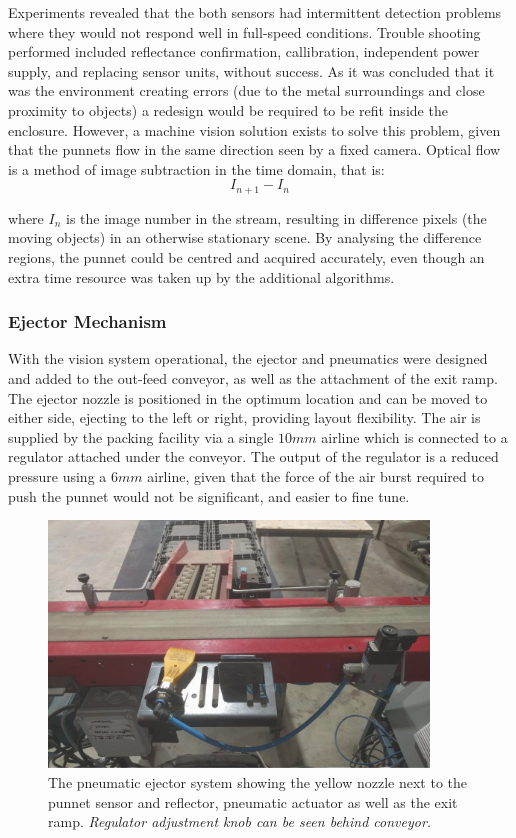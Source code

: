 \documentclass[fleqn,twoside]{article}
\begin{document}
Experiments revealed that the both sensors had intermittent detection problems where they would not respond well in full-speed conditions. Trouble shooting performed included reflectance confirmation, callibration, independent power supply, and replacing sensor units, without success. As it was concluded that it was the environment creating errors (due to the metal surroundings and close proximity to objects) a redesign would be required to be refit inside the enclosure. However, a machine vision solution exists to solve this problem, given that the punnets flow in the same direction seen by a fixed camera. Optical flow is a method of image subtraction in the time domain, that is:
\begin{equation}
	I_{n+1} - I_n
\end{equation}

where $I_n$ is the image number in the stream, resulting in difference pixels (the moving objects) in an otherwise stationary scene. By analysing the difference regions, the punnet could be centred and acquired accurately, even though an extra time resource was taken up by the additional algorithms. 

\subsubsection{Ejector Mechanism}

With the vision system operational, the ejector and pneumatics were designed and added to the out-feed conveyor, as well as the attachment of the exit ramp. The ejector nozzle is positioned in the optimum location and can be moved to either side, ejecting to the left or right, providing layout flexibility. The air is supplied by the packing facility via a single $10mm$ airline which is connected to a regulator attached under the conveyor. The output of the regulator is a reduced pressure using a $6mm$ airline, given that the force of the air burst required to push the punnet would not be significant, and easier to fine tune.


\begin{figure}[h]
	\centering
	\includegraphics[width=0.9\textwidth]{ejector.jpg}
	\caption{The pneumatic ejector system showing the yellow nozzle next to the punnet sensor and reflector, pneumatic actuator as well as the exit ramp. \textit{Regulator adjustment knob can be seen behind conveyor.}}
	\label{fig:ejector}
\end{figure}
\end{document}
